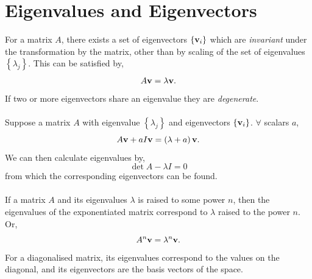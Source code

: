 \documentclass{book}
\begin{document}
\section{Eigenvalues and Eigenvectors}
For a matrix $A$, there exists a set of eigenvectors $\left\{\vb{v}_i\right\}$ which are \textit{invariant} under the transformation by the matrix, other than by scaling of the set of eigenvalues $\left\{\lambda_j\right\}$. This can be satisfied by,
\begin{equation}
	A\vb{v} = \lambda \vb{v}.
\end{equation}
If two or more eigenvectors share an eigenvalue they are \textit{degenerate}.
\\\\
Suppose a matrix $A$ with eigenvalue $\left\{\lambda_j\right\}$ and eigenvectors $\left\{\vb{v}_i\right\}$. $\forall$ scalars $a$,
\begin{equation}
	A\vb{v} + aI\vb{v} = \left(\lambda + a\right)\vb{v}.
\end{equation}
We can then calculate eigenvalues by,
\begin{equation}
	\det{A - \lambda I} = 0
\end{equation}
from which the corresponding eigenvectors can be found.
\\\\
If a matrix $A$ and its eigenvalues $\lambda$ is raised to some power $n$, then the eigenvalues of the exponentiated matrix correspond to $\lambda$ raised to the power $n$. Or,
\begin{equation}
	A^n\vb{v} = \lambda^n \vb{v}.
\end{equation}
For a diagonalised matrix, its eigenvalues correspond to the values on the diagonal, and its eigenvectors are the basis vectors of the space.
\end{document}
